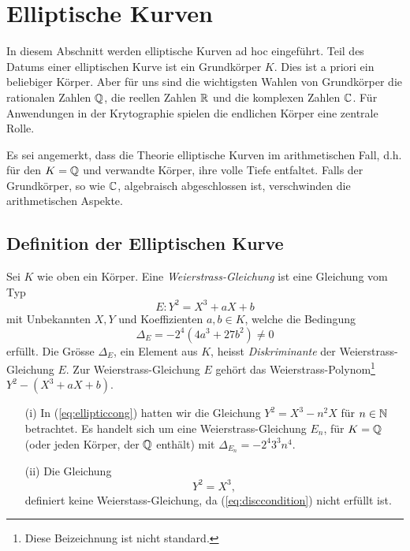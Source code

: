 \chapter{Elliptische Kurven}

In diesem Abschnitt werden elliptische Kurven ad hoc eingeführt.
Teil des Datums einer elliptischen Kurve ist ein Grundkörper $K$. Dies
ist a priori ein beliebiger Körper. Aber für uns sind die wichtigsten
Wahlen von Grundkörper die rationalen Zahlen ${\mathbb{Q}}$, die reellen Zahlen
${\mathbb{R}}$ und die komplexen Zahlen ${\mathbb{C}}$. Für Anwendungen in der
Krytographie spielen  die endlichen Körper eine zentrale Rolle.


Es sei angemerkt, dass die Theorie elliptische Kurven im
arithmetischen Fall, d.h. für den  $K={\mathbb{Q}}$ und verwandte Körper, ihre
volle Tiefe entfaltet. Falls der Grundkörper, so wie ${\mathbb{C}}$,
algebraisch abgeschlossen ist, verschwinden die arithmetischen
Aspekte.


\section{Definition der Elliptischen Kurve}

\begin{definition}
  Sei $K$ wie oben ein Körper.
  Eine \emph{Weierstrass-Gleichung} ist eine Gleichung vom Typ
  \begin{equation}
    \label{eq:weierstrass}
    E: Y^2 = X^3 + aX+b
  \end{equation}
  mit Unbekannten $X,Y$ und Koeffizienten $a,b\in K$, welche die
  Bedingung
  \begin{equation}
    \label{eq:disccondition}
    \Delta_E = -2^4(4a^3+27b^2)\not=0
  \end{equation}
  erfüllt. Die Grösse $\Delta_E$, ein Element aus $K$, heisst
  \emph{Diskriminante}
  der Weierstrass-Gleichung $E$. Zur Weierstrass-Gleichung $E$ gehört
  das Weierstrass-Polynom\footnote{Diese Beizeichnung ist nicht
    standard.} $Y^2- (X^3+aX+b)$.
\end{definition}

\begin{beispiele}\leavevmode
  \begin{enumerate}
  \item [(i)] In (\ref{eq:ellipticcong}) hatten wir die Gleichung $Y^2 = X^3-n^2X$
    für $n\in{\mathbb{N}}$ betrachtet. Es handelt sich um eine
    Weierstrass-Gleichung $E_n$, für $K={\mathbb{Q}}$ (oder jeden Körper, der ${\mathbb{Q}}$
    enthält) mit $\Delta_{E_n} = -2^4 3^3 n^4$.
  \item[(ii)] Die Gleichung
    \begin{equation*}
      Y^2 = X^3,
    \end{equation*}
    definiert keine Weierstass-Gleichung, da (\ref{eq:disccondition})
    nicht erfüllt ist.
  \end{enumerate}
\end{beispiele}

